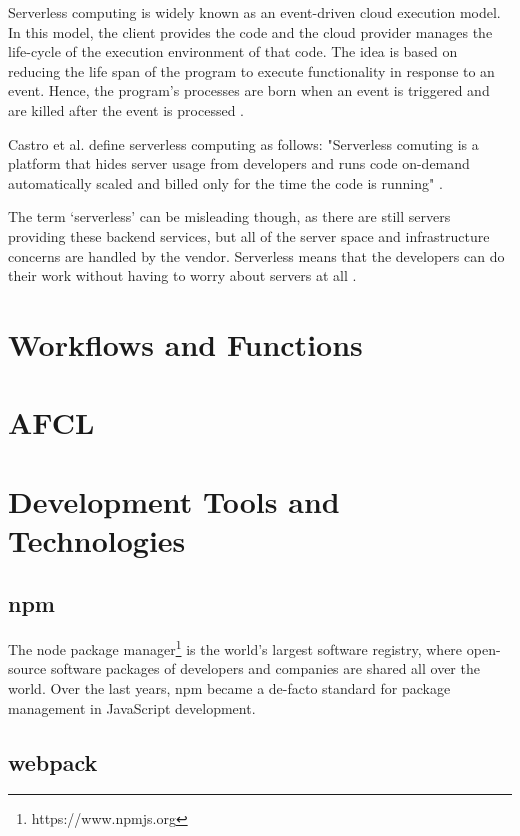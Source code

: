 \documentclass[a4paper,11pt,pdftex,halfparskip,cleardoubleempty,bibtotoc,liststotoc]{scrbook}
\begin{document}
Serverless computing is widely known as an event-driven cloud execution model. In this model, the client provides the code and the cloud provider manages the life-cycle of the execution environment of that code.
The idea is based on reducing the life span of the program to execute functionality in response to an event. Hence, the program's processes are born when an event is triggered and are killed after the event is processed \cite{inproceedings-serverless-beyond-the-cloud-kanso}.

Castro et al. define serverless computing as follows: "Serverless comuting is a platform that hides server usage from developers and runs code on-demand automatically scaled and billed only for the time the code is running" \cite{articles-rise-of-serverless-castro}.

The term ‘serverless’ can be misleading though, as there are still servers providing these backend services, but all of the server space and infrastructure concerns are handled by the vendor. Serverless means that the developers can do their work without having to worry about servers at all \cite{online-what-is-serverless-cloudflare}.



\section{Workflows and Functions}


\section{AFCL}

\section{Development Tools and Technologies}
\subsection{npm}

The node package manager\footnote{https://www.npmjs.org} is the world's largest software registry, where open-source software packages of developers and companies are shared all over the world. Over the last years, npm became a de-facto standard for package management in JavaScript development.

\subsection{webpack}
\end{document}
